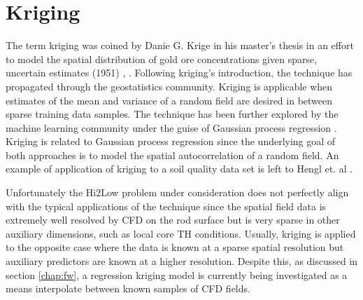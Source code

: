 \section{Kriging}

The term kriging was coined by Danie G. Krige in his master's thesis in an effort to model the spatial distribution of gold ore concentrations given sparse, uncertain estimates (1951) \cite{krige51}, \cite{Krige51a}. Following kriging's introduction, the technique has propagated through the geostatistics community.  Kriging is applicable when estimates of the mean and variance of a random field are desired in between sparse training data samples.  The technique has been further explored by the machine learning community under the guise of Gaussian process regression \cite{Williams96}.  Kriging is related to Gaussian process regression since the underlying goal of both approaches is to model the spatial autocorrelation of a random field.  An example of application of kriging to a soil quality data set is left to Hengl et. al \cite{Hengl07}.

Unfortunately the Hi2Low problem under consideration does not perfectly align with the typical applications of the technique since the spatial field data is extremely well resolved by CFD on the rod surface but is very sparse in other auxiliary dimensions, such as local core TH conditions.  Usually, kriging is applied to the opposite case where the data is known at a sparse spatial resolution but auxiliary predictors are known at a higher resolution.  Despite this, as discussed in section \ref{chap:fw}, a regression kriging model is currently being investigated as a means interpolate between known samples of CFD fields.

